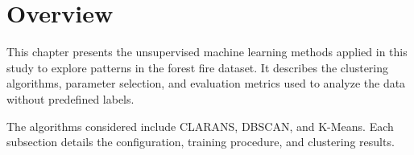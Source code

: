 \section{Overview}

This chapter presents the unsupervised machine learning methods applied in this study to explore patterns in the forest fire dataset. It describes the clustering algorithms, parameter selection, and evaluation metrics used to analyze the data without predefined labels.

The algorithms considered include CLARANS, DBSCAN, and K-Means. Each subsection details the configuration, training procedure, and clustering results.




